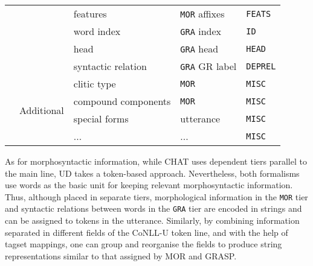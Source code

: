 \begin{table}[h!]
\begin{tabularx}{\widefigurewidth}{@{}lcXll@{}}
\multicolumn{1}{l}{\multirow{11}{*}{}}&\multicolumn{1}{c}{\multirow{4}{*}{}}& features        & \texttt{MOR} affixes& \texttt{FEATS}\\\addlinespace
\multicolumn{1}{l}{\multirow{11}{*}{}}&\multicolumn{1}{c}{\multirow{3}{*}{Syntactic}}& word index      & \texttt{GRA} index& \texttt{ID}\\
\multicolumn{1}{l}{\multirow{11}{*}{}}&\multicolumn{1}{c}{\multirow{3}{*}{}}& head            & \texttt{GRA} head& \texttt{HEAD}\\
\multicolumn{1}{l}{\multirow{11}{*}{}}&\multicolumn{1}{c}{\multirow{3}{*}{}}& syntactic relation  & \texttt{GRA} GR label& \texttt{DEPREL}\\\addlinespace
\multicolumn{1}{l}{\multirow{11}{*}{}}&\multicolumn{1}{c}{\multirow{4}{*}{Additional}}& clitic type      & \texttt{MOR} & \texttt{MISC}\\
\multicolumn{1}{l}{\multirow{11}{*}{}}&\multicolumn{1}{c}{\multirow{4}{*}{}}& compound components  & \texttt{MOR} & \texttt{MISC}\\
\multicolumn{1}{l}{\multirow{11}{*}{}}&\multicolumn{1}{c}{\multirow{4}{*}{}}& special forms     & utterance & \texttt{MISC}\\
\multicolumn{1}{l}{\multirow{11}{*}{}}&\multicolumn{1}{c}{\multirow{4}{*}{}}& ...              & ... & \texttt{MISC}\\
\bottomrule
\end{tabularx}
\end{table}

As for morphosyntactic information, while CHAT uses dependent tiers parallel to the main line, UD takes a token-based approach. Nevertheless, both formalisms use words as the basic unit for keeping relevant morphosyntactic information. Thus, although placed in separate tiers, morphological information in the \texttt{MOR} tier and syntactic relations between words in the \texttt{GRA} tier are encoded in strings and can be assigned to tokens in the utterance. Similarly, by combining information separated in different fields of the CoNLL-U token line, and with the help of tagset mappings, one can group and reorganise the fields to produce string representations similar to that assigned by MOR and GRASP.
